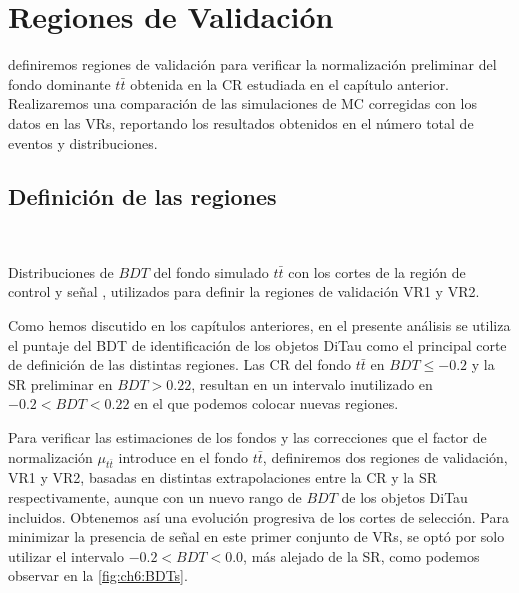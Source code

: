 \chapter{Regiones de Validación} \label{chap:ch6}

 definiremos regiones de validación para verificar la normalización preliminar del fondo dominante $t\bar{t}$ obtenida en la CR estudiada en el capítulo anterior. Realizaremos una comparación de las simulaciones de MC corregidas con los datos en las VRs, reportando los resultados obtenidos en el número total de eventos y distribuciones.


\section{Definición de las regiones}

\begin{marginfigure}[5em]
    \\

    \caption{Distribuciones de $BDT$ del fondo simulado $t\bar{t}$ con los cortes de la región de control  y señal , utilizados para definir la regiones de validación VR1 y VR2.}
    \label{fig:ch6:BDTs}
\end{marginfigure}

Como hemos discutido en los capítulos anteriores, en el presente análisis se utiliza el puntaje del BDT de identificación de los objetos DiTau como el principal corte de definición de las distintas regiones. Las CR del fondo $t\bar{t}$ en $BDT \leq -0.2$ y la SR preliminar en $BDT > 0.22$, resultan en un intervalo inutilizado en $-0.2 < BDT < 0.22$ en el que podemos colocar nuevas regiones.

Para verificar las estimaciones de los fondos y las correcciones que el factor de normalización $\mu_{t\bar{t}}$ introduce en el fondo $t\bar{t}$, definiremos dos regiones de validación, VR1 y VR2, basadas en distintas extrapolaciones entre la CR y la SR respectivamente, aunque con un nuevo rango de $BDT$ de los objetos DiTau incluidos. Obtenemos así una evolución progresiva de los cortes de selección. Para minimizar la presencia de señal en este primer conjunto de VRs, se optó por solo utilizar el intervalo $-0.2 < BDT < 0.0$, más alejado de la SR, como podemos observar en la \cref{fig:ch6:BDTs}.

